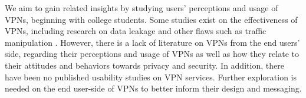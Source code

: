 We aim to gain related insights by studying users' perceptions and usage of
VPNs, beginning with college students. Some studies exist on the effectiveness
of VPNs, including research on data leakage and other flaws such as traffic
manipulation \cite{khan_1, ikram_6}. However, there is a lack of literature on VPNs from the
end users' side, regarding their perceptions and usage of VPNs as well as how
they relate to their attitudes and behaviors towards privacy and security. In
addition, there have been no published usability studies on VPN services.
Further exploration is needed on the end user-side of VPNs to better inform
their design and messaging.
